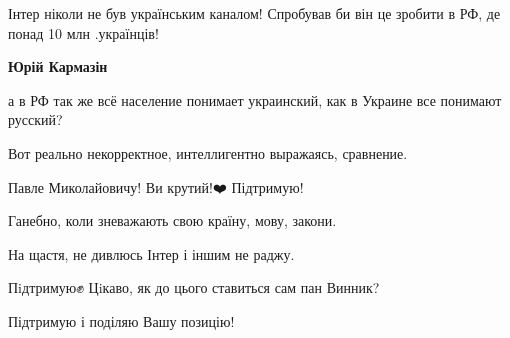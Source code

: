 \begin{itemize}
Інтер ніколи не був українським каналом! Спробував би він це зробити в РФ, де
понад 10 млн .українців!

\begin{itemize}
 
\textbf{Юрій Кармазін} 

а в РФ так же всё население понимает украинский, как в Украине все понимают
русский?

Вот реально некорректное, интеллигентно выражаясь, сравнение.

\end{itemize}

 
Павле Миколайовичу! Ви крутий!❤️ Підтримую!🙌🏼

 

Ганебно, коли зневажають свою країну, мову, закони.

На щастя, не дивлюсь Інтер і іншим не раджу.

 
Пiдтримую✊
Цiкаво, як до цього ставиться сам пан Винник?

 
Підтримую і поділяю Вашу позицію!

 

\end{itemize}
